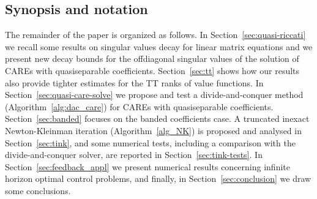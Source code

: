 \documentclass[a4paper,10pt]{article}
\newtheorem{definition}{Definition}[section]
\newtheorem{theorem}[definition]{Theorem}
\begin{document}
%
%
%
%
%



\subsection{Synopsis and notation}
The remainder of the paper is organized as follows. In Section~\ref{sec:quasi-riccati} we recall some
results on singular values decay for linear matrix equations and we present new decay bounds
for the offdiagonal singular values of the solution of CAREs with quasiseparable coefficients. Section~\ref{sec:tt} shows how our results also provide tighter estimates for the TT ranks of value functions. In Section~\ref{sec:quasi-care-solve} we propose and test a divide-and-conquer method (Algorithm~\ref{alg:dac_care}) for CAREs with quasiseparable coefficients. Section~\ref{sec:banded} focuses on the banded coefficients case. A truncated inexact Newton-Kleinman iteration (Algorithm~\ref{alg_NK}) is proposed and analysed in Section~\ref{sec:tink}, and some numerical tests, including a comparison with the divide-and-conquer solver, are reported in Section~\ref{sec:tink-tests}. In Section~\ref{sec:feedback_appl} we present numerical results concerning infinite horizon optimal control problems, and finally, in Section~\ref{sec:conclusion}
we draw some conclusions.
\end{document}
